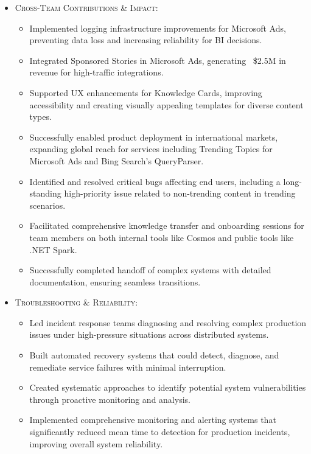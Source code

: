 \begin{itemize}
\begin{itemize}
        \item \scriptsize{\textsc{Cross-Team Contributions \& Impact:}}
        \begin{itemize}
            \item \scriptsize{Implemented logging infrastructure improvements for Microsoft Ads, preventing data loss and increasing reliability for BI decisions.}
            \item \scriptsize{Integrated Sponsored Stories in Microsoft Ads, generating ~\$2.5M in revenue for high-traffic integrations.}
            \item \scriptsize{Supported UX enhancements for Knowledge Cards, improving accessibility and creating visually appealing templates for diverse content types.}
            \item \scriptsize{Successfully enabled product deployment in international markets, expanding global reach for services including Trending Topics for Microsoft Ads and Bing Search's QueryParser.}
            \item \scriptsize{Identified and resolved critical bugs affecting end users, including a long-standing high-priority issue related to non-trending content in trending scenarios.}
            \item \scriptsize{Facilitated comprehensive knowledge transfer and onboarding sessions for team members on both internal tools like Cosmos and public tools like .NET Spark.}
            \item \scriptsize{Successfully completed handoff of complex systems with detailed documentation, ensuring seamless transitions.}
        \end{itemize}

        \item \scriptsize{\textsc{Troubleshooting \& Reliability:}}
        \begin{itemize}
            \item \scriptsize{Led incident response teams diagnosing and resolving complex production issues under high-pressure situations across distributed systems.}
            \item \scriptsize{Built automated recovery systems that could detect, diagnose, and remediate service failures with minimal interruption.}
            \item \scriptsize{Created systematic approaches to identify potential system vulnerabilities through proactive monitoring and analysis.}
            \item \scriptsize{Implemented comprehensive monitoring and alerting systems that significantly reduced mean time to detection for production incidents, improving overall system reliability.}
        \end{itemize}


\end{itemize}
\end{itemize}
